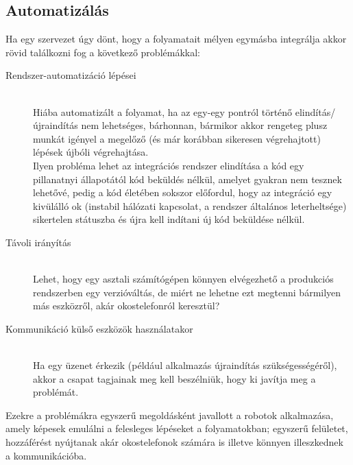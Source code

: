 \subsection{Automatizálás}
\label{subsec:automating}
Ha egy szervezet úgy dönt, hogy a folyamatait mélyen egymásba integrálja akkor rövid találkozni fog a következő problémákkal:
\begin{description}
\item[Rendszer-automatizáció lépései]\hfill\\
Hiába automatizált a folyamat, ha az egy-egy pontról történő elindítás/újraindítás nem lehetséges, bárhonnan, bármikor akkor rengeteg plusz munkát igényel a megelőző (és már korábban sikeresen végrehajtott) lépések újbóli végrehajtása.\\
Ilyen probléma lehet az integrációs rendszer elindítása a kód egy pillanatnyi állapotától kód beküldés nélkül, amelyet gyakran nem tesznek lehetővé, pedig a kód életében sokszor előfordul, hogy az integráció egy kivülálló ok (instabil hálózati kapcsolat, a rendszer általános leterheltsége) sikertelen státuszba és újra kell indítani új kód beküldése nélkül.

\item[Távoli irányítás]\hfill\\
Lehet, hogy egy asztali számítógépen könnyen elvégezhető a produkciós rendszerben egy verzióváltás, de miért ne lehetne ezt megtenni bármilyen más eszközről, akár okostelefonról keresztül?

\item[Kommunikáció külső eszközök használatakor]\hfill\\
Ha egy üzenet érkezik (például alkalmazás újraindítás szükségességéről), akkor a csapat tagjainak meg kell beszélniük, hogy ki javítja meg a problémát.
\end{description}

Ezekre a problémákra egyszerű megoldásként javallott a robotok alkalmazása, amely képesek emulálni a felesleges lépéseket a folyamatokban; egyszerű felületet, hozzáférést nyújtanak akár okostelefonok számára is illetve könnyen illeszkednek a kommunikációba.

